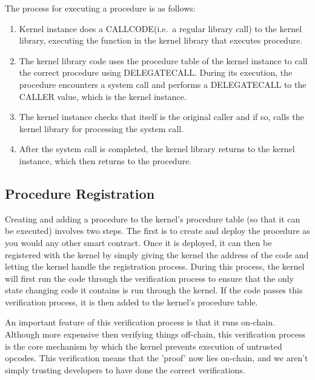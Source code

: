 \documentclass[english,a4paper]{article}
\begin{document}
The process for executing a procedure is as follows:

\begin{minipage}{\textwidth}
\begin{enumerate}
\def\labelenumi{\arabic{enumi}.}
\item
  Kernel instance does a CALLCODE\footnotemark (i.e.~a regular
  library call) to the kernel
  library, executing the function in the kernel library that executes
  procedure.
\item
  The kernel library code uses the procedure table of the kernel
  instance to call the correct procedure using DELEGATECALL. During its
  execution, the procedure encounters a system call and performs a
  DELEGATECALL to the CALLER value, which is the kernel instance.
\item
  The kernel instance checks that itself is the original caller and if
  so, calls the kernel library for processing the system call.
\item
  After the system call is completed, the kernel library returns to the
  kernel instance, which then returns to the procedure.
\end{enumerate}
\end{minipage}

\subsection{Procedure Registration}\label{procedure-creation}
Creating and adding a procedure to the kernel's procedure table (so that it can
be executed) involves two steps. The first is to create and deploy the procedure
as you would any other smart contract. Once it is deployed, it can then be
registered with the kernel by simply giving the kernel the address of the code
and letting the kernel handle the registration process. During this process, the
kernel will first run the code through the verification process to ensure that
the only state changing code it contains is run through the kernel. If the code
passes this verification process, it is then added to the kernel's procedure
table.

An important feature of this verification process is that it runs on-chain.
Although more expensive then verifying things off-chain, this verification
process is the core mechanism by which the kernel prevents execution of
untrusted opcodes. This verification means that the 'proof' now lies on-chain,
and we aren't simply trusting developers to have done the correct verifications.
\end{document}
